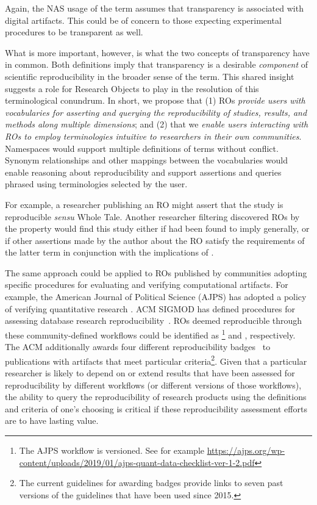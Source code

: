 \noindent Again, the NAS usage of the term assumes that transparency is associated with digital artifacts.
This could be of concern to those expecting experimental procedures to be transparent as well.

What is more important, however, is what the two concepts of transparency have in common.
Both definitions imply that transparency is a desirable \emph{component} of scientific
    reproducibility in the broader sense of the term.
This shared insight suggests a role for Research Objects to play in the resolution of this
    terminological conundrum.
In short, we propose that (1) ROs \emph{provide users with vocabularies for asserting and
    querying the reproducibility of studies, results, and methods along multiple dimensions};
    and (2) that we \emph{enable users interacting with ROs to employ terminologies intuitive to
    researchers in their own communities}.
Namespaces would support multiple definitions of terms without conflict.
Synonym relationships and other mappings between the vocabularies would enable reasoning about
    reproducibility and support assertions and queries phrased using terminologies selected by
    the user.

    For example, a researcher publishing an RO might assert that the
    study is reproducible \emph{sensu} Whole Tale.  Another researcher
    filtering discovered ROs by the property 
    would find this study either if  had been
    found to imply  generally, or if other
    assertions made by the author about the RO satisfy the
    requirements of the latter term in conjunction with the
    implications of .

The same approach could be applied to ROs published by communities adopting specific
    procedures for evaluating and verifying computational artifacts.
For example, the American Journal of Political Science (AJPS) has adopted a policy of
    verifying quantitative research \cite{christian2018}.
ACM SIGMOD has defined procedures for assessing database research
    reproducibility~\cite{bonnet_repeatability_2011, sigmod2018reproducibility}.
ROs deemed reproducible through these community-defined workflows could be
    identified as \footnote{
        The AJPS workflow is versioned. See for example
        \url{https://ajps.org/wp-content/uploads/2019/01/ajps-quant-data-checklist-ver-1-2.pdf}
    } and , respectively.
The ACM additionally awards four different reproducibility badges~\cite{acm2018artifact} to publications
    with artifacts that meet particular criteria\footnote{The current guidelines for awarding
    badges provide links to seven past versions of the guidelines that have been used since 2015.}.
Given that a particular researcher is likely to depend on or extend results that have been
    assessed for reproducibility by different workflows (or different versions of those
    workflows), the ability to query the reproducibility of research products using the definitions and
    criteria of one's choosing is critical if these reproducibility assessment efforts
    are to have lasting value.

